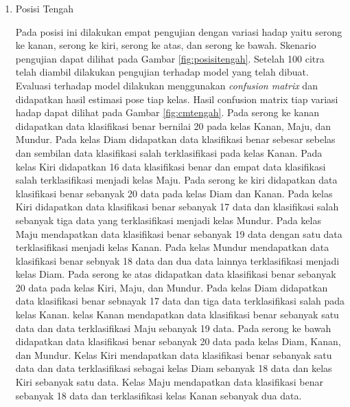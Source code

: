 \begin{enumerate}
  \item Posisi Tengah \par
  Pada posisi ini dilakukan empat pengujian dengan variasi hadap yaitu serong ke kanan, serong ke kiri, serong ke atas, dan serong ke bawah. Skenario pengujian dapat dilihat pada Gambar \ref{fig:posisitengah}. Setelah 100 citra telah diambil dilakukan pengujian terhadap model yang telah dibuat. Evaluasi terhadap model dilakukan menggunakan \emph{confusion matrix} dan didapatkan hasil estimasi pose tiap kelas. Hasil confusion matrix tiap variasi hadap dapat dilihat pada Gambar \ref{fig:cmtengah}. Pada serong ke kanan didapatkan data klasifikasi benar bernilai 20 pada kelas Kanan, Maju, dan Mundur. Pada kelas Diam didapatkan data klasifikasi benar sebesar sebelas dan sembilan data klasifikasi salah terklasifikasi pada kelas Kanan. Pada kelas Kiri didapatkan 16 data klasifikasi benar dan empat data klasifikasi salah terklasifikasi menjadi kelas Maju. Pada serong ke kiri didapatkan data klasifikasi benar sebanyak 20 data pada kelas Diam dan Kanan. Pada kelas Kiri didapatkan data klasifikasi benar sebanyak 17 data dan klasifikasi salah sebanyak tiga data yang terklasifikasi menjadi kelas Mundur. Pada kelas Maju mendapatkan data klasifikasi benar sebanyak 19 data dengan satu data terklasifikasi menjadi kelas Kanan. Pada kelas Mundur mendapatkan data klasifikasi benar sebnyak 18 data dan dua data lainnya terklasifikasi menjadi kelas Diam. Pada serong ke atas didapatkan data klasifikasi benar sebanyak 20 data pada kelas Kiri, Maju, dan Mundur. Pada kelas Diam didapatkan data klasifikasi benar sebnayak 17 data dan tiga data terklasifikasi salah pada kelas Kanan. kelas Kanan mendapatkan data klasifikasi benar sebanyak satu data dan data terklasifikasi Maju sebanyak 19 data. Pada serong ke bawah didapatkan data klasifikasi benar sebanyak 20 data pada kelas Diam, Kanan, dan Mundur. Kelas Kiri mendapatkan data klasifikasi benar sebanyak satu data dan data terklasifikasi sebagai kelas Diam sebanyak 18 data dan kelas Kiri sebanyak satu data. Kelas Maju mendapatkan data klasifikasi benar sebanyak 18 data dan terklasifikasi kelas Kanan sebanyak dua data.


\end{enumerate}
